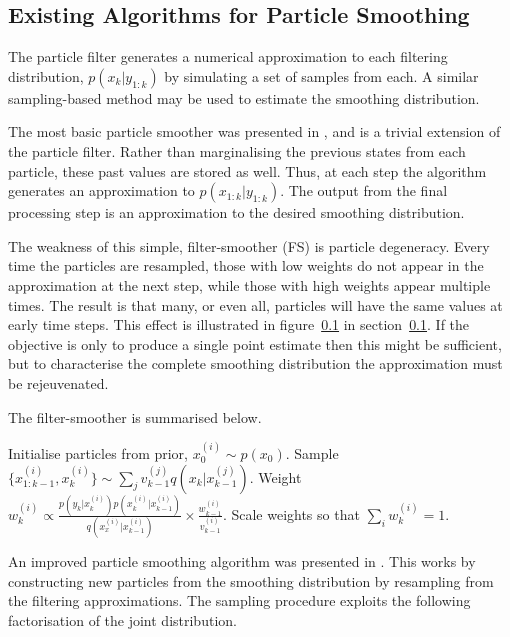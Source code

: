 \documentclass[journal]{IEEEtran}
\begin{document}
\subsection{Existing Algorithms for Particle Smoothing }

The particle filter generates a numerical approximation to each filtering distribution, $p(x_k|y_{1:k})$ by simulating a set of samples from each. A similar sampling-based method may be used to estimate the smoothing distribution.

The most basic particle smoother was presented in \cite{Kitagawa1996}, and is a trivial extension of the particle filter. Rather than marginalising the previous states from each particle, these past values are stored as well. Thus, at each step the algorithm generates an approximation to $p(x_{1:k}|y_{1:k})$. The output from the final processing step is an approximation to the desired smoothing distribution.

The weakness of this simple, filter-smoother (FS) is particle degeneracy. Every time the particles are resampled, those with low weights do not appear in the approximation at the next step, while those with high weights appear multiple times. The result is that many, or even all, particles will have the same values at early time steps. This effect is illustrated in figure~\ref{} in section~\ref{}. If the objective is only to produce a single point estimate then this might be sufficient, but to characterise the complete smoothing distribution the approximation must be rejeuvenated.

The filter-smoother is summarised below.%

\begin{algorithmic}
 	\STATE Initialise particles from prior, $x_{0}^{(i)} \sim p(x_{0})$.
 			\STATE Sample $\{ x_{1:k-1}^{(i)}, x_k^{(i)} \} \sim \sum_j v_{k-1}^{(j)} q(x_k|x_{k-1}^{(j)})$.
 			\STATE Weight $w_{k}^{(i)} \propto \frac{ p(y_k|x_k^{(i)}) p(x_k^{(i)}|x_{k-1}^{(i)}) }{ q(x_{x}^{(i)}|x_{k-1}^{(i)}) } \times \frac{w_{k-1}^{(i)}}{v_{k-1}^{(i)} }$.
 		\ENDFOR
 	  \STATE Scale weights so that $\sum_i w_{k}^{(i)} = 1$.
 	\ENDFOR
 \end{algorithmic}

An improved particle smoothing algorithm was presented in \cite{Godsill2004}. This works by constructing new particles from the smoothing distribution by resampling from the filtering approximations. The sampling procedure exploits the following factorisation of the joint distribution.
\end{document}
